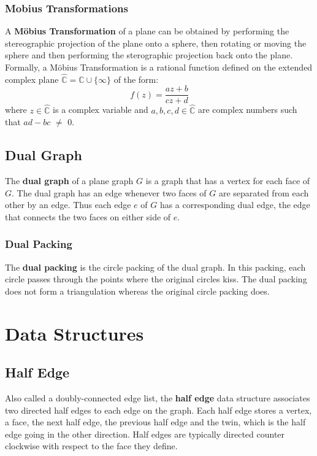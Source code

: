 \documentclass{article}
\newcommand{\C}{\mathbb{C}}
\newcommand{\CP}{\hat{\mathbb{C}}}
\begin{document}
  \subsubsection{Mobius Transformations}
  A \textbf{M\"{o}bius Transformation} of a plane can be obtained by performing the stereographic projection of the plane onto a sphere, then rotating or moving the sphere and then performing the sterographic projection back onto the plane. 
  Formally, a M\"{o}bius Transformation is a rational function defined on the extended complex plane $\CP = \C\cup\{\infty\}$ of the form:
  \begin{equation} 
	f(z) = \frac{az+b}{cz+d}
  \end{equation}
  where $z\in\CP$ is a complex variable and $a,b,c,d\in\CP$ are complex numbers such that $ad - bc$ $\neq$ $0$.

 \subsection{Dual Graph}
  The \textbf{dual graph} of a plane graph $G$ is a graph that has a vertex for each face of $G$. 
  The dual graph has an edge whenever two faces of $G$ are separated from each other by an edge. 
  Thus each edge $e$ of $G$ has a corresponding dual edge, the edge that connects the two faces on either side of $e$. 

  \subsubsection{Dual Packing}
  The \textbf{dual packing} is the circle packing of the dual graph. 
  In this packing, each circle passes through the points where the original circles kiss. 
  The dual packing does not form a triangulation whereas the original circle packing does.

\section{Data Structures}
 \subsection{Half Edge}
  Also called a doubly-connected edge list, the \textbf{half edge} data structure associates two directed half edges to each edge on the graph. 
  Each half edge stores a vertex, a face, the next half edge, the previous half edge and the twin, which is the half edge going in the other direction. 
  Half edges are typically directed counter clockwise with respect to the face they define.



\end{document}
